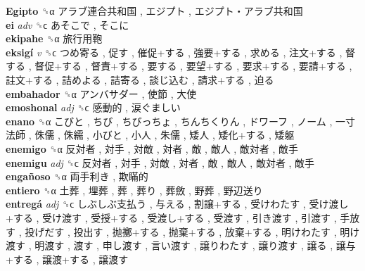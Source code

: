 \textbf{Egipto} ␝α   アラブ連合共和国 ,  エジプト ,  エジプト・アラブ共和国   \\
\textbf{ei} \emph{adv}  ␝ϲ   あそこで ,  そこに   \\
\textbf{ekipahe} ␝α   旅行用鞄   \\
\textbf{eksigí} \emph{v}  ␝ϲ   つめ寄る ,  促す ,  催促+する ,  強要+する ,  求める ,  注文+する ,  督する ,  督促+する ,  督責+する ,  要する ,  要望+する ,  要求+する ,  要請+する ,  註文+する ,  詰めよる ,  詰寄る ,  談じ込む ,  請求+する ,  迫る   \\
\textbf{embahador} ␝α   アンバサダー ,  使節 ,  大使   \\
\textbf{emoshonal} \emph{adj}  ␝ϲ   感動的 ,  涙ぐましい   \\
\textbf{enano} ␝α   こびと ,  ちび ,  ちびっちょ ,  ちんちくりん ,  ドワーフ ,  ノーム ,  一寸法師 ,  侏儒 ,  侏繻 ,  小びと ,  小人 ,  朱儒 ,  矮人 ,  矮化+する ,  矮躯   \\
\textbf{enemigo} ␝α   反対者 ,  対手 ,  対敵 ,  対者 ,  敵 ,  敵人 ,  敵対者 ,  敵手   \\
\textbf{enemigu} \emph{adj}  ␝ϲ   反対者 ,  対手 ,  対敵 ,  対者 ,  敵 ,  敵人 ,  敵対者 ,  敵手   \\
\textbf{engañoso} ␝α   両手利き ,  欺瞞的   \\
\textbf{entiero} ␝α   土葬 ,  埋葬 ,  葬 ,  葬り ,  葬斂 ,  野葬 ,  野辺送り   \\
\textbf{entregá} \emph{adj}  ␝ϲ   しぶしぶ支払う ,  与える ,  割譲+する ,  受けわたす ,  受け渡し+する ,  受け渡す ,  受授+する ,  受渡し+する ,  受渡す ,  引き渡す ,  引渡す ,  手放す ,  投げだす ,  投出す ,  抛擲+する ,  抛棄+する ,  放棄+する ,  明けわたす ,  明け渡す ,  明渡す ,  渡す ,  申し渡す ,  言い渡す ,  譲りわたす ,  譲り渡す ,  譲る ,  譲与+する ,  譲渡+する ,  譲渡す   \\
